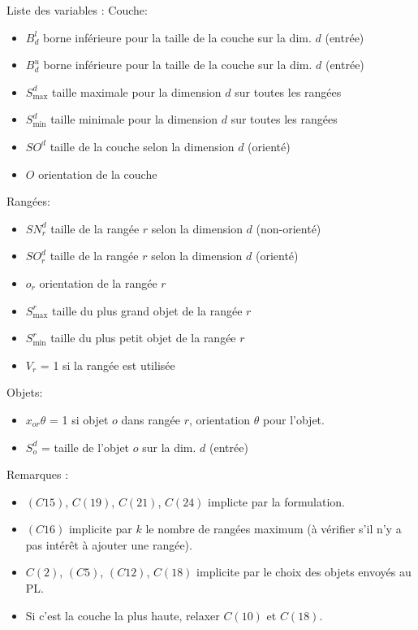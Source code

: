 \documentclass[10pt,twocolumn]{article}
\begin{document}
\small
Liste des variables :
Couche:
\begin{itemize}
    \item{$B_d^l$ borne inférieure pour la taille de la couche sur la dim. $d$ (entrée)}
    \item{$B_d^u$ borne inférieure pour la taille de la couche sur la dim. $d$ (entrée)}
    \item{$S_{\max}^d$ taille maximale pour la dimension $d$ sur toutes les rangées}
    \item{$S_{\min}^d$ taille minimale pour la dimension $d$ sur toutes les rangées}
    \item{$SO^d$ taille de la couche selon la dimension $d$ (orienté)}
    \item{$O$ orientation de la couche}
\end{itemize}

Rangées:
\begin{itemize}
    \item{$SN_r^d$ taille de la rangée $r$ selon la dimension $d$ (non-orienté)}
    \item{$SO_r^d$ taille de la rangée $r$ selon la dimension $d$ (orienté)}
    \item{$o_r$ orientation de la rangée $r$}
    \item{$S_{\max}^r$ taille du plus grand objet de la rangée $r$}
    \item{$S_{\min}^r$ taille du plus petit objet de la rangée $r$}
    \item{$V_r$ = 1 si la rangée est utilisée}
\end{itemize}

Objets:
\begin{itemize}
    \item{$x_{or}{\theta}$ = 1 si objet $o$ dans rangée $r$, orientation $\theta$ pour l'objet.}
    \item{$S_o^d$ = taille de l'objet $o$ sur la dim. $d$ (entrée)}
\end{itemize}

Remarques : 
\begin{itemize}
    \item{$(C15)$, $C(19)$, $C(21)$, $C(24)$ implicte par la formulation.}
    \item{$(C16)$ implicite par $k$ le nombre de rangées maximum (à vérifier s'il n'y a pas intérêt à ajouter une rangée).}
    \item{$C(2)$, $(C5)$, $(C12)$, $C(18)$ implicite par le choix des objets envoyés au PL.}
    \item{Si c'est la couche la plus haute, relaxer $C(10)$ et $C(18)$.}
\end{itemize}
\end{document}
